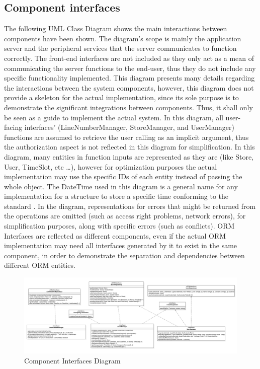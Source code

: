 \subsection{Component interfaces}
The following UML Class Diagram shows the main interactions between components have been shown.
The diagram's scope is mainly the application server and the peripheral services that the server communicates to function correctly.
The front-end interfaces are not included as they only act as a mean of communicating the server functions to the end-user, thus they do not include any specific functionality implemented.
This diagram presents many details regarding the interactions between the system components, however, this diagram does not provide a skeleton for the actual implementation, since its sole purpose is to demonstrate the significant integrations between components.
Thus, it shall only be seen as a guide to implement the actual system.
In this diagram, all user-facing interfaces' (LineNumberManager, StoreManager, and UserManager) functions are assumed to retrieve the user calling as an implicit argument, thus the authorization aspect is not reflected in this diagram for simplification.
In this diagram, many entities in function inputs are represented as they are (like Store, User, TimeSlot, etc \ldots), however for optimization purposes the actual implementation may use the specific IDs of each entity instead of passing the whole object.
The DateTime used in this diagram is a general name for any implementation for a structure to store a specific time conforming to the standard \cite{isoutc}.
In the diagram, representations for errors that might be returned from the operations are omitted (such as access right problems, network errors), for simplification purposes, along with specific errors (such as conflicts).
ORM Interfaces are reflected as different components, even if the actual ORM implementation may need all interfaces generated by it to exist in the same component, in order to demonstrate the separation and dependencies between different ORM entities.
\begin{figure}[H]
    \centering
    \includegraphics[height=0.4\textwidth]{Images/ComponentInterfacesDiagram.png}
    \caption{Component Interfaces Diagram}
    \label{fig:ComponentInterfaces}
\end{figure}
